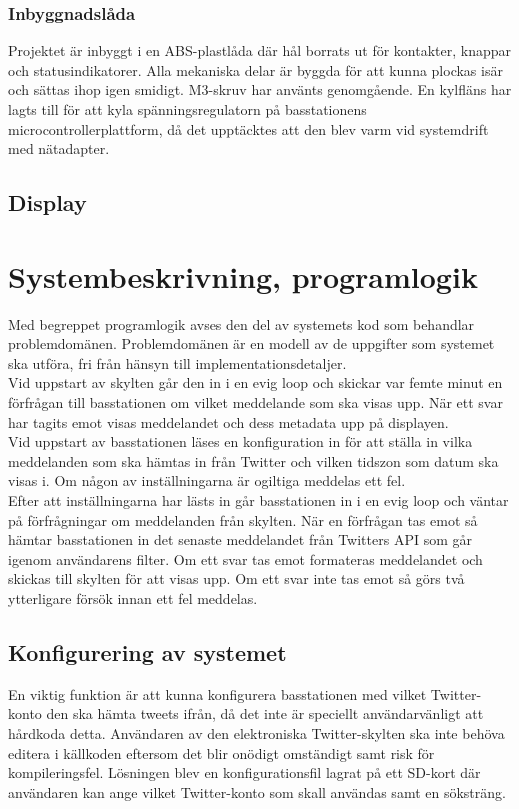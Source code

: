 \documentclass[a4paper,11pt]{article}
\begin{document}
\subsubsection{Inbyggnadslåda}
Projektet är inbyggt i en ABS-plastlåda där hål borrats ut för kontakter, knappar och statusindikatorer. Alla mekaniska delar är byggda för att kunna plockas isär och sättas ihop igen smidigt. M3-skruv har använts genomgående. En kylfläns har lagts till för att kyla spänningsregulatorn på basstationens microcontrollerplattform, då det upptäcktes att den blev varm vid systemdrift med nätadapter.

\subsection{Display}

\section{Systembeskrivning, programlogik}
Med begreppet programlogik avses den del av systemets kod som behandlar problemdomänen. Problemdomänen är en modell av de uppgifter som systemet ska utföra, fri från hänsyn till implementationsdetaljer. \\

Vid uppstart av skylten går den in i en evig loop och skickar var femte minut en förfrågan till basstationen om vilket meddelande som ska visas upp. När ett svar har tagits emot visas meddelandet och dess metadata upp på displayen. \\

Vid uppstart av basstationen läses en konfiguration in för att ställa in vilka meddelanden som ska hämtas in från Twitter och vilken tidszon som datum ska visas i. Om någon av inställningarna är ogiltiga meddelas ett fel. \\

Efter att inställningarna har lästs in går basstationen in i en evig loop och väntar på förfrågningar om meddelanden från skylten. När en förfrågan tas emot så hämtar basstationen in det senaste meddelandet från Twitters API som går igenom användarens filter. Om ett svar tas emot formateras meddelandet och skickas till skylten för att visas upp. Om ett svar inte tas emot så görs två ytterligare försök innan ett fel meddelas.

\subsection{Konfigurering av systemet}
En viktig funktion är att kunna konfigurera basstationen med vilket Twitter-konto den ska hämta tweets ifrån, då det inte är speciellt användarvänligt att hårdkoda detta. Användaren av den elektroniska Twitter-skylten ska inte behöva editera i källkoden eftersom det blir onödigt omständigt samt risk för kompileringsfel. Lösningen blev en konfigurationsfil lagrat på ett SD-kort där användaren kan ange vilket Twitter-konto som skall användas samt en söksträng.\\
\end{document}
